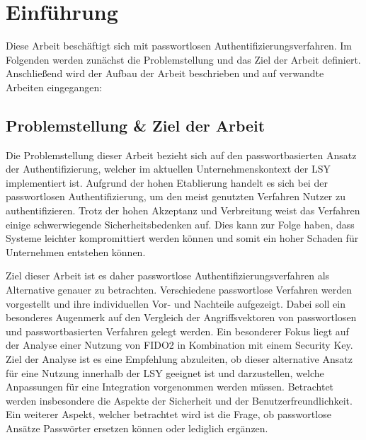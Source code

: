 
\chapter{Einführung}
Diese Arbeit beschäftigt sich mit passwortlosen Authentifizierungsverfahren. Im Folgenden werden zunächst die Problemstellung und das Ziel der Arbeit definiert. Anschließend wird der Aufbau der Arbeit beschrieben und auf verwandte Arbeiten eingegangen:

\section{Problemstellung \& Ziel der Arbeit} \label{target}
Die Problemstellung dieser Arbeit bezieht sich auf den passwortbasierten Ansatz der Authentifizierung, welcher im aktuellen Unternehmenskontext der \ac{LSY} implementiert ist. Aufgrund der hohen Etablierung handelt es sich bei der passwortlosen Authentifizierung, um den meist genutzten Verfahren Nutzer zu authentifizieren. Trotz der hohen Akzeptanz und Verbreitung weist das Verfahren einige schwerwiegende Sicherheitsbedenken auf. Dies kann zur Folge haben, dass Systeme leichter kompromittiert werden können und somit ein hoher Schaden für Unternehmen entstehen können.

Ziel dieser Arbeit ist es daher passwortlose Authentifizierungsverfahren als Alternative genauer zu betrachten. Verschiedene passwortlose Verfahren werden vorgestellt und ihre individuellen Vor- und Nachteile aufgezeigt. Dabei soll ein besonderes Augenmerk auf den Vergleich der Angriffsvektoren von passwortlosen und passwortbasierten Verfahren gelegt werden. Ein besonderer Fokus liegt auf der Analyse einer Nutzung von \ac{FIDO}2 in Kombination mit einem Security Key. Ziel der Analyse ist es eine Empfehlung abzuleiten, ob dieser alternative Ansatz für eine Nutzung innerhalb der \ac{LSY} geeignet ist und darzustellen, welche Anpassungen für eine Integration vorgenommen werden müssen. Betrachtet werden insbesondere die Aspekte der Sicherheit und der Benutzerfreundlichkeit. Ein weiterer Aspekt, welcher betrachtet wird ist die Frage, ob passwortlose Ansätze Passwörter ersetzen können oder lediglich ergänzen. 

